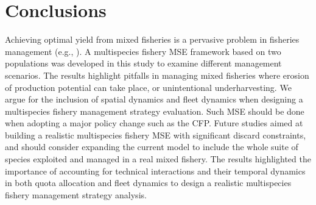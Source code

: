 \documentclass[12pt,oneline,a4paper,numbib]{ouparticle}
\numberwithin{equation}{subsection} %
\begin{document}
\section{Conclusions}

Achieving optimal yield from mixed fisheries is a pervasive problem in fisheries management (e.g., \cite{Farcas2016, Prellezo2016b, Salomon2014, Ulrich2017, Voss2014}). A multispecies fishery MSE framework based on two populations was developed in this study to examine different management scenarios. The results highlight pitfalls in managing mixed fisheries where erosion of production potential can take place, or unintentional underharvesting. We argue for the inclusion of spatial dynamics and fleet dynamics when designing a multispecies fishery management strategy evaluation. Such MSE should be done  when adopting a major policy change such as the CFP. Future studies aimed at building a realistic multispecies fishery MSE with significant discard constraints, and should consider expanding the current model to include the whole suite of species exploited and managed in a real mixed fishery. The results highlighted the importance of accounting for technical interactions and their temporal dynamics in both quota allocation and fleet dynamics to design a realistic multispecies fishery management strategy analysis.

\end{document}
